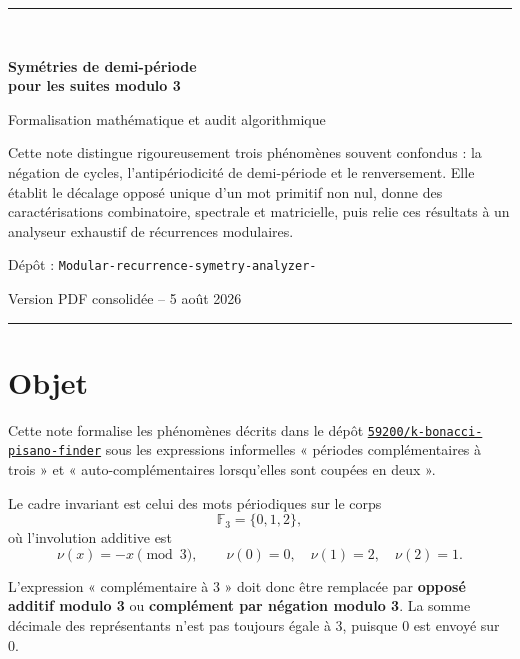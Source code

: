 \documentclass[11pt,a4paper]{article}
\newcommand{\F}{\mathbb F}
\begin{document}
\begin{titlepage}
\thispagestyle{empty}
\vspace*{22mm}
{\color{accent}\rule{\textwidth}{1.2pt}}\\[15mm]
{\fontsize{27}{33}\selectfont\bfseries\color{ink}
Symétries de demi-période\\[2mm]
pour les suites modulo 3\par}
\vspace{9mm}
{\Large\color{accent}Formalisation mathématique et audit algorithmique\par}
\vspace{13mm}
\begin{summarybox}
Cette note distingue rigoureusement trois phénomènes souvent confondus :
la négation de cycles, l'antipériodicité de demi-période et le renversement.
Elle établit le décalage opposé unique d'un mot primitif non nul, donne des
caractérisations combinatoire, spectrale et matricielle, puis relie ces
résultats à un analyseur exhaustif de récurrences modulaires.
\end{summarybox}
\vfill
{\large\color{muted}Dépôt : \texttt{Modular-recurrence-symetry-analyzer-}\par}
{\large\color{muted}Version PDF consolidée -- 5 août 2026\par}
\vspace{12mm}
{\color{accent}\rule{\textwidth}{1.2pt}}
\end{titlepage}

\tableofcontents
\clearpage

\section{Objet}

Cette note formalise les phénomènes décrits dans le dépôt
\href{https://github.com/59200/k-bonacci-pisano-finder}{\texttt{59200/k-bonacci-pisano-finder}}
sous les expressions informelles « périodes complémentaires à trois » et
« auto-complémentaires lorsqu'elles sont coupées en deux ».

Le cadre invariant est celui des mots périodiques sur le corps
\[
\F_3=\{0,1,2\},
\]
où l'involution additive est
\[
\nu(x)=-x\pmod 3,
\qquad
\nu(0)=0,\quad \nu(1)=2,\quad \nu(2)=1.
\]

L'expression « complémentaire à 3 » doit donc être remplacée par
\textbf{opposé additif modulo 3} ou \textbf{complément par négation modulo 3}.
La somme décimale des représentants n'est pas toujours égale à 3, puisque
0 est envoyé sur 0.
\end{document}
